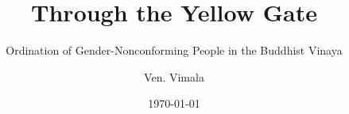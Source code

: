 \clearpage
\thispagestyle{empty}
\titlehead{}
\title{Through the Yellow Gate}
\subtitle{Ordination of Gender-Nonconforming People in the Buddhist Vinaya}
\author{Ven. Vimala}
\date{\today}
\maketitle
